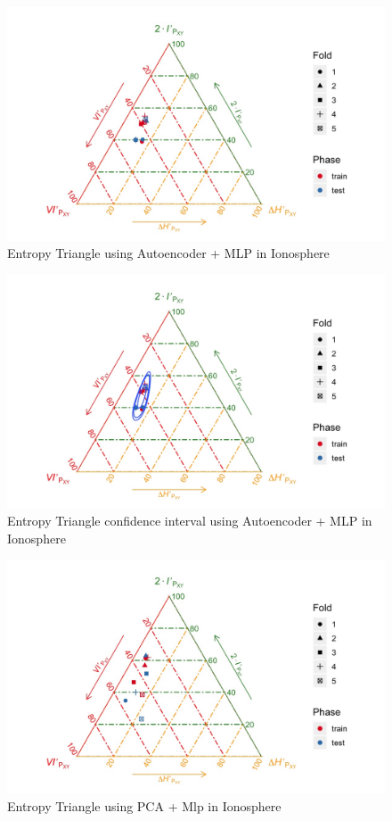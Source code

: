 \begin{figure}[H]
	\centering
	\includegraphics[width=\linewidth]{Figuras_tfg/ET_Iono_Auto_Mlp}
	\caption{Entropy Triangle using Autoencoder + MLP in Ionosphere}
	\label{fig:figure_Mlp_Iono_ET_Auto}
\end{figure}

\begin{figure}[H]
	\centering
	\includegraphics[width=\linewidth]{Figuras_tfg/ET_Iono_Auto_Mlp_Confidence}
	\caption{Entropy Triangle confidence interval using Autoencoder + MLP in Ionosphere}
	\label{fig:figure_Mlp_Iono_ET_Auto_Confidence}
\end{figure}

\begin{figure}[H]
	\centering
	\includegraphics[width=\linewidth]{Figuras_tfg/ET_Iono_PCA_Mlp}
	\caption{Entropy Triangle using PCA + Mlp in Ionosphere}
	\label{fig:figure_Mlp_Iono_ET_PCA}
\end{figure}

